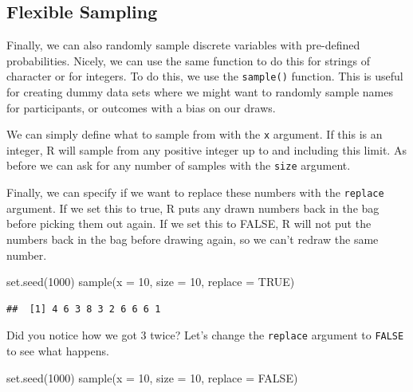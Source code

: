 \documentclass[
]{book}
\newenvironment{Shaded}{\begin{snugshade}}{\end{snugshade}}
\newcommand{\AttributeTok}[1]{\textcolor[rgb]{0.77,0.63,0.00}{#1}}
\newcommand{\ConstantTok}[1]{\textcolor[rgb]{0.00,0.00,0.00}{#1}}
\newcommand{\DecValTok}[1]{\textcolor[rgb]{0.00,0.00,0.81}{#1}}
\newcommand{\FunctionTok}[1]{\textcolor[rgb]{0.00,0.00,0.00}{#1}}
\newcommand{\NormalTok}[1]{#1}
\begin{document}
\hypertarget{flexible-sampling}{%
\subsection{Flexible Sampling}\label{flexible-sampling}}

Finally, we can also randomly sample discrete variables with pre-defined probabilities. Nicely, we can use the same function to do this for strings of character or for integers. To do this, we use the \texttt{sample()} function. This is useful for creating dummy data sets where we might want to randomly sample names for participants, or outcomes with a bias on our draws.

We can simply define what to sample from with the \texttt{x} argument. If this is an integer, R will sample from any positive integer up to and including this limit. As before we can ask for any number of samples with the \texttt{size} argument.

Finally, we can specify if we want to replace these numbers with the \texttt{replace} argument. If we set this to true, R puts any drawn numbers back in the bag before picking them out again. If we set this to FALSE, R will not put the numbers back in the bag before drawing again, so we can't redraw the same number.

\begin{Shaded}
\begin{Highlighting}[]
\FunctionTok{set.seed}\NormalTok{(}\DecValTok{1000}\NormalTok{)}
\FunctionTok{sample}\NormalTok{(}\AttributeTok{x =} \DecValTok{10}\NormalTok{, }\AttributeTok{size =} \DecValTok{10}\NormalTok{, }\AttributeTok{replace =} \ConstantTok{TRUE}\NormalTok{)}
\end{Highlighting}
\end{Shaded}

\begin{verbatim}
##  [1] 4 6 3 8 3 2 6 6 6 1
\end{verbatim}

Did you notice how we got 3 twice? Let's change the \texttt{replace} argument to \texttt{FALSE} to see what happens.

\begin{Shaded}
\begin{Highlighting}[]
\FunctionTok{set.seed}\NormalTok{(}\DecValTok{1000}\NormalTok{)}
\FunctionTok{sample}\NormalTok{(}\AttributeTok{x =} \DecValTok{10}\NormalTok{, }\AttributeTok{size =} \DecValTok{10}\NormalTok{, }\AttributeTok{replace =} \ConstantTok{FALSE}\NormalTok{)}
\end{Highlighting}
\end{Shaded}
\end{document}
